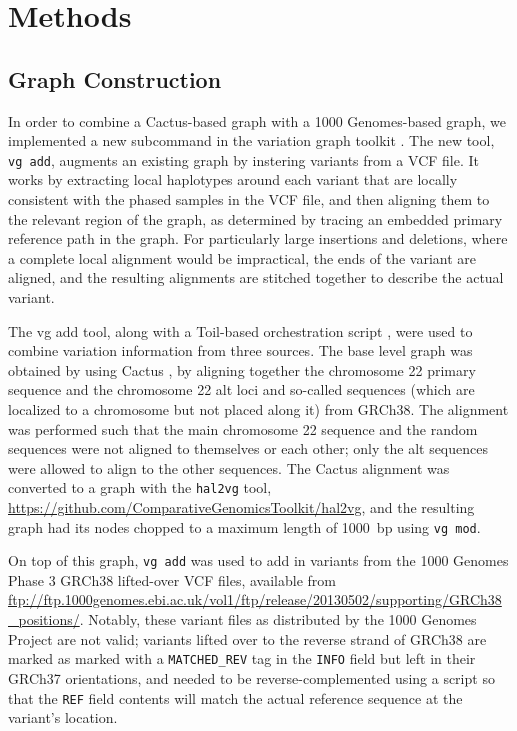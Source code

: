 \section{Methods}

\subsection{Graph Construction}

In order to combine a Cactus-based graph with a 1000 Genomes-based graph, we implemented a new subcommand in the \vg variation graph toolkit \cite{garrison2016vg}. The new tool, \texttt{vg add}, augments an existing graph by instering variants from a VCF file. It works by extracting local haplotypes around each variant that are locally consistent with the phased samples in the VCF file, and then aligning them to the relevant region of the graph, as determined by tracing an embedded primary reference path in the graph. For particularly large insertions and deletions, where a complete local alignment would be impractical, the ends of the variant are aligned, and the resulting alignments are stitched together to describe the actual variant.

The vg add tool, along with a Toil-based orchestration script \cite{vivian2017toil}, were used to combine variation information from three sources. The base level graph was obtained by using Cactus \cite{paten2011cactus2}, by aligning together the chromosome 22 primary sequence and the chromosome 22 alt loci and so-called  sequences (which are localized to a chromosome but not placed along it) from GRCh38. The alignment was performed such that the main chromosome 22 sequence and the random sequences were not aligned to themselves or each other; only the alt sequences were allowed to align to the other sequences.
The Cactus alignment was converted to a \vg graph with the \texttt{hal2vg} tool, \url{https://github.com/ComparativeGenomicsToolkit/hal2vg}, and the resulting graph had its nodes chopped to a maximum length of 1000~bp using \texttt{vg mod}.

\begin{sloppypar}
On top of this graph, \texttt{vg add} was used to add in variants from the 1000 Genomes Phase 3 GRCh38 lifted-over VCF files, available from \url{ftp://ftp.1000genomes.ebi.ac.uk/vol1/ftp/release/20130502/supporting/GRCh38_positions/}. Notably, these variant files as distributed by the 1000 Genomes Project are not valid; variants lifted over to the reverse strand of GRCh38 are marked as marked with a \texttt{MATCHED\_REV} tag in the \texttt{INFO} field but left in their GRCh37 orientations, and needed to be reverse-complemented using a script so that the \texttt{REF} field contents will match the actual reference sequence at the variant's location.
\end{sloppypar}

